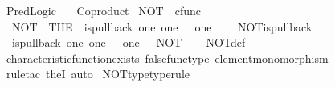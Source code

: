 %
\begin{isabellebody}%
%
%
\isadelimtheory
%
\endisadelimtheory
%
\isatagtheory
{}\isamarkupfalse%
\ Pred{\isacharunderscore}{\kern0pt}Logic\isanewline
\ \ \ Coproduct\isanewline
{}%
\endisatagtheory
{\isafoldtheory}%
%
\isadelimtheory
%
\endisadelimtheory
%
\isadelimdocument
%
\endisadelimdocument
%
\isatagdocument
%
\isamarkuptrue%
%
\isamarkuptrue%
%
\endisatagdocument
{\isafolddocument}%
%
\isadelimdocument
%
\endisadelimdocument
{}\isamarkupfalse%
\ NOT\ {\isacharcolon}{\kern0pt}{\isacharcolon}{\kern0pt}\ {\isachardoublequoteopen}cfunc{\isachardoublequoteclose}\ \isanewline
\ \ {\isachardoublequoteopen}NOT\ {\isacharequal}{\kern0pt}\ {\isacharparenleft}{\kern0pt}THE\ {\isasymchi}{\isachardot}{\kern0pt}\ is{\isacharunderscore}{\kern0pt}pullback\ one\ one\ {\isasymOmega}\ {\isasymOmega}\ {\isacharparenleft}{\kern0pt}{\isasymbeta}\isactrlbsub one\isactrlesub {\isacharparenright}{\kern0pt}\ {\isasymt}\ {\isasymf}\ {\isasymchi}{\isacharparenright}{\kern0pt}{\isachardoublequoteclose}\isanewline
\isanewline
{}\isamarkupfalse%
\ NOT{\isacharunderscore}{\kern0pt}is{\isacharunderscore}{\kern0pt}pullback{\isacharcolon}{\kern0pt}\isanewline
\ \ {\isachardoublequoteopen}is{\isacharunderscore}{\kern0pt}pullback\ one\ one\ {\isasymOmega}\ {\isasymOmega}\ {\isacharparenleft}{\kern0pt}{\isasymbeta}\isactrlbsub one\isactrlesub {\isacharparenright}{\kern0pt}\ {\isasymt}\ {\isasymf}\ NOT{\isachardoublequoteclose}\isanewline
%
\isadelimproof
\ \ %
\endisadelimproof
%
\isatagproof
{}\isamarkupfalse%
\ NOT{\isacharunderscore}{\kern0pt}def\isanewline
\ \ \isamarkupfalse%
\ characteristic{\isacharunderscore}{\kern0pt}function{\isacharunderscore}{\kern0pt}exists\ false{\isacharunderscore}{\kern0pt}func{\isacharunderscore}{\kern0pt}type\ element{\isacharunderscore}{\kern0pt}monomorphism\isanewline
\ \ \isamarkupfalse%
\ {\isacharparenleft}{\kern0pt}rule{\isacharunderscore}{\kern0pt}tac\ the{}I{}{\isacharcomma}{\kern0pt}\ auto{\isacharparenright}{\kern0pt}%
\endisatagproof
{\isafoldproof}%
%
\isadelimproof
\isanewline
%
\endisadelimproof
\isanewline
{}\isamarkupfalse%
\ NOT{\isacharunderscore}{\kern0pt}type{\isacharbrackleft}{\kern0pt}type{\isacharunderscore}{\kern0pt}rule{\isacharbrackright}{\kern0pt}{\isacharcolon}{\kern0pt}\isanewline

\end{isabellebody}
